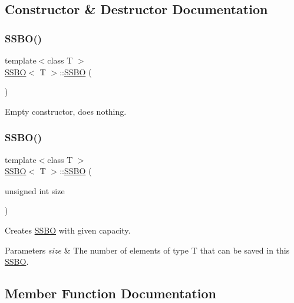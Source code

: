 \subsection{Constructor \& Destructor Documentation}
\mbox{\label{class_s_s_b_o_afb9a8159d1a56fbe8ab2e7fa732aa735}} 
\subsubsection{\texorpdfstring{SSBO()}{SSBO()}\hspace{0.1cm}{\footnotesize\ttfamily [1/2]}}
{\footnotesize\ttfamily template$<$class T $>$ \\
\mbox{\hyperlink{class_s_s_b_o}{S\+S\+BO}}$<$ T $>$\+::\mbox{\hyperlink{class_s_s_b_o}{S\+S\+BO}} (\begin{DoxyParamCaption}{ }\end{DoxyParamCaption})}

Empty constructor, does nothing. \mbox{\label{class_s_s_b_o_a16eace3a6222a1d7d52473177e0b021d}} 
\subsubsection{\texorpdfstring{SSBO()}{SSBO()}\hspace{0.1cm}{\footnotesize\ttfamily [2/2]}}
{\footnotesize\ttfamily template$<$class T $>$ \\
\mbox{\hyperlink{class_s_s_b_o}{S\+S\+BO}}$<$ T $>$\+::\mbox{\hyperlink{class_s_s_b_o}{S\+S\+BO}} (\begin{DoxyParamCaption}\item[{unsigned int}]{size }\end{DoxyParamCaption})}

Creates \mbox{\hyperlink{class_s_s_b_o}{S\+S\+BO}} with given capacity.


\begin{DoxyParams}{Parameters}
{\em size} & The number of elements of type T that can be saved in this \mbox{\hyperlink{class_s_s_b_o}{S\+S\+BO}}. \\
\hline
\end{DoxyParams}


\subsection{Member Function Documentation}
\mbox{\label{class_s_s_b_o_a5cd3bcb7229aaadf919bedf0d9e0ae73}} 
